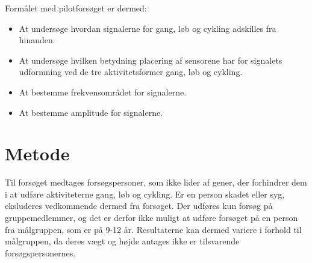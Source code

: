 Formålet med pilotforsøget er dermed:
\begin{itemize}
	\item At undersøge hvordan signalerne for gang, løb og cykling adskilles fra hinanden. 
	\item At undersøge hvilken betydning placering af sensorene har for signalets udformning ved de tre aktivitetsformer gang, løb og cykling. 
	\item At bestemme frekvensområdet for signalerne.
	\item At bestemme amplitude for signalerne.
\end{itemize}

\section{Metode}
Til forsøget medtages forsøgspersoner, som ikke lider af gener, der forhindrer dem i at udføre aktiviteterne gang, løb og cykling. Er en person skadet eller syg, eksluderes vedkommende dermed fra forsøget. Der udføres kun forsøg på gruppemedlemmer, og det er derfor ikke muligt at udføre forsøget på en person fra målgruppen, som er på 9-12 år. Resultaterne kan dermed variere i forhold til målgruppen, da deres vægt og højde antages ikke er tilsvarende forsøgspersonernes. 

